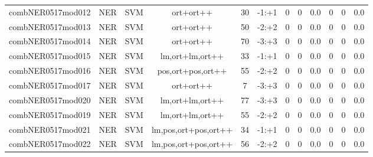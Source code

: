 \documentclass[a4paper]{article}
\begin{document}
\begin{landscape}
\begin{center}
\begin{tabular}{ |c|c|c|c|c|c|c|c|c|c|c|c|}
 
 	
 	\small{ combNER0517mod012 } & \small{ NER} & \small{  SVM }  & ort+ort++  &  30 &  \small{  -1:+1 }  &  0 & 0 & 0.0  &  0 & 0 & 0.0 \\
 	

 
 	
 	\small{ combNER0517mod013 } & \small{ NER} & \small{  SVM }  & ort+ort++  &  50 &  \small{  -2:+2 }  &  0 & 0 & 0.0  &  0 & 0 & 0.0 \\
 	

 
 	
 	\small{ combNER0517mod014 } & \small{ NER} & \small{  SVM }  & ort+ort++  &  70 &  \small{  -3:+3 }  &  0 & 0 & 0.0  &  0 & 0 & 0.0 \\
 	

 
 	
 	\small{ combNER0517mod015 } & \small{ NER} & \small{  SVM }  & lm,ort+lm,ort++  &  33 &  \small{  -1:+1 }  &  0 & 0 & 0.0  &  0 & 0 & 0.0 \\
 	

 
 	
 	\small{ combNER0517mod016 } & \small{ NER} & \small{  SVM }  & pos,ort+pos,ort++  &  55 &  \small{  -2:+2 }  &  0 & 0 & 0.0  &  0 & 0 & 0.0 \\
 	

 
 	
 	\small{ combNER0517mod017 } & \small{ NER} & \small{  SVM }  & ort+ort++  &  7 &  \small{  -3:+3 }  &  0 & 0 & 0.0  &  0 & 0 & 0.0 \\
 	

 
 	
 	\small{ combNER0517mod020 } & \small{ NER} & \small{  SVM }  & lm,ort+lm,ort++  &  77 &  \small{  -3:+3 }  &  0 & 0 & 0.0  &  0 & 0 & 0.0 \\
 	

 
 	
 	\small{ combNER0517mod019 } & \small{ NER} & \small{  SVM }  & lm,ort+lm,ort++  &  55 &  \small{  -2:+2 }  &  0 & 0 & 0.0  &  0 & 0 & 0.0 \\
 	

 
 	
 	\small{ combNER0517mod021 } & \small{ NER} & \small{  SVM }  & lm,pos,ort+pos,ort++  &  34 &  \small{  -1:+1 }  &  0 & 0 & 0.0  &  0 & 0 & 0.0 \\
 	

 
 	
 	\small{ combNER0517mod022 } & \small{ NER} & \small{  SVM }  & lm,pos,ort+pos,ort++  &  56 &  \small{  -2:+2 }  &  0 & 0 & 0.0  &  0 & 0 & 0.0 \\
 	


\end{tabular}
\end{center}
\end{landscape}
\end{document}
